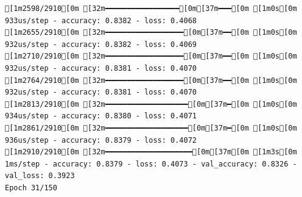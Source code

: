 \documentclass[
  letterpaper,
  DIV=11,
  numbers=noendperiod]{scrartcl}
\begin{document}
\begin{verbatim}
[1m2598/2910[0m [32m━━━━━━━━━━━━━━━━━[0m[37m━━━[0m [1m0s[0m 933us/step - accuracy: 0.8382 - loss: 0.4068
[1m2655/2910[0m [32m━━━━━━━━━━━━━━━━━━[0m[37m━━[0m [1m0s[0m 932us/step - accuracy: 0.8382 - loss: 0.4069
[1m2710/2910[0m [32m━━━━━━━━━━━━━━━━━━[0m[37m━━[0m [1m0s[0m 932us/step - accuracy: 0.8381 - loss: 0.4070
[1m2764/2910[0m [32m━━━━━━━━━━━━━━━━━━[0m[37m━━[0m [1m0s[0m 932us/step - accuracy: 0.8381 - loss: 0.4070
[1m2813/2910[0m [32m━━━━━━━━━━━━━━━━━━━[0m[37m━[0m [1m0s[0m 934us/step - accuracy: 0.8380 - loss: 0.4071
[1m2861/2910[0m [32m━━━━━━━━━━━━━━━━━━━[0m[37m━[0m [1m0s[0m 936us/step - accuracy: 0.8379 - loss: 0.4072
[1m2910/2910[0m [32m━━━━━━━━━━━━━━━━━━━━[0m[37m[0m [1m3s[0m 1ms/step - accuracy: 0.8379 - loss: 0.4073 - val_accuracy: 0.8326 - val_loss: 0.3923
Epoch 31/150


\end{verbatim}
\end{document}
